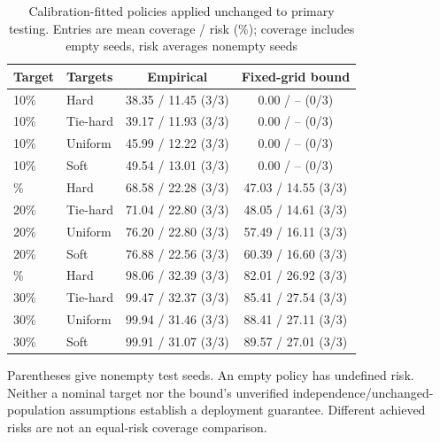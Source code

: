 \begin{table}[t]
\caption{Calibration-fitted policies applied unchanged to primary testing. Entries are mean coverage / risk (\%); coverage includes empty seeds, risk averages nonempty seeds}\label{tab:policies}
\centering\begin{tabular}{llcc}\toprule
Target & Targets & Empirical & Fixed-grid bound\\\midrule
10\% & Hard & 38.35 / 11.45 (3/3) & 0.00 / -- (0/3)\\
10\% & Tie-hard & 39.17 / 11.93 (3/3) & 0.00 / -- (0/3)\\
10\% & Uniform & 45.99 / 12.22 (3/3) & 0.00 / -- (0/3)\\
10\% & Soft & 49.54 / 13.01 (3/3) & 0.00 / -- (0/3)\\
\addlinespace
20\% & Hard & 68.58 / 22.28 (3/3) & 47.03 / 14.55 (3/3)\\
20\% & Tie-hard & 71.04 / 22.80 (3/3) & 48.05 / 14.61 (3/3)\\
20\% & Uniform & 76.20 / 22.80 (3/3) & 57.49 / 16.11 (3/3)\\
20\% & Soft & 76.88 / 22.56 (3/3) & 60.39 / 16.60 (3/3)\\
\addlinespace
30\% & Hard & 98.06 / 32.39 (3/3) & 82.01 / 26.92 (3/3)\\
30\% & Tie-hard & 99.47 / 32.37 (3/3) & 85.41 / 27.54 (3/3)\\
30\% & Uniform & 99.94 / 31.46 (3/3) & 88.41 / 27.11 (3/3)\\
30\% & Soft & 99.91 / 31.07 (3/3) & 89.57 / 27.01 (3/3)\\
\bottomrule\end{tabular}
\smallskip\par\footnotesize Parentheses give nonempty test seeds. An empty policy has undefined risk. Neither a nominal target nor the bound's unverified independence/unchanged-population assumptions establish a deployment guarantee. Different achieved risks are not an equal-risk coverage comparison.
\end{table}
